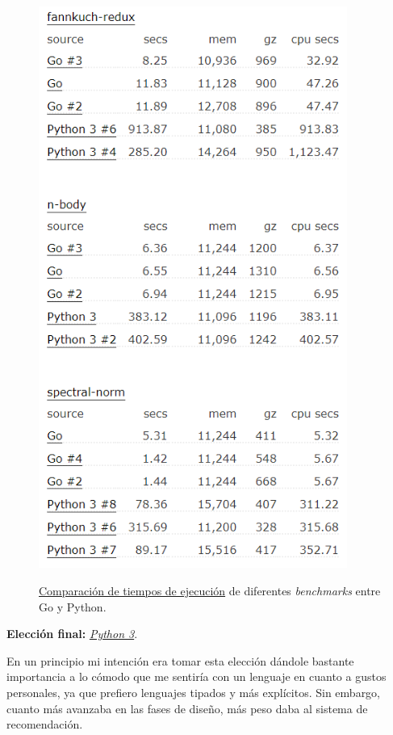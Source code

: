 \begin{figure}[H]
    \includegraphics[width=0.9\textwidth]{img/python_vs_go.png}\\[1.4cm]
    \caption{\href{https://benchmarksgame-team.pages.debian.net/benchmarksgame/fastest/go-python3.html}{Comparación de tiempos de ejecución} de diferentes \textit{benchmarks} entre Go y Python.}
\end{figure}
\textbf{Elección final:} \href{https://www.python.org/}{\textit{Python 3}}.

En un principio mi intención era tomar esta elección dándole bastante importancia a lo cómodo que me sentiría con un lenguaje en cuanto a gustos personales, ya que prefiero lenguajes tipados y más explícitos. Sin embargo, cuanto más avanzaba en las fases de diseño, más peso daba al sistema de recomendación. 

